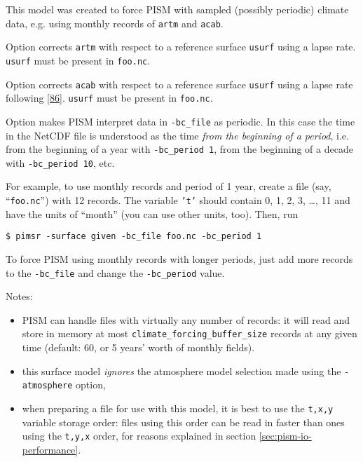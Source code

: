 \begin{itemize}
    This model was created to force PISM with sampled (possibly periodic) climate data, e.g. using monthly records of \texttt{artm} and \texttt{acab}.

 Option  corrects \texttt{artm} with respect to a reference surface \texttt{usurf} using a lapse rate. \texttt{usurf} must be present in \texttt{foo.nc}.

 Option  corrects \texttt{acab} with respect to a reference surface \texttt{usurf} using a lapse rate following [\href{http://www.truenuff.tv/glacierrace.php}{86}]. \texttt{usurf} must be present in \texttt{foo.nc}.

Option  makes PISM interpret data in \texttt{-bc_file} as periodic. In this case the time in the NetCDF file is understood as the time \emph{from the beginning of a period}, i.e. from the beginning of a year with \texttt{-bc_period 1}, from the beginning of a decade with \texttt{-bc_period 10}, etc.

For example, to use monthly records and period of 1 year, create a file (say, ``\texttt{foo.nc}'') with 12 records. The variable \texttt{'t'} should contain 0, 1, 2, 3, \dots, 11 and have the units of ``month'' (you can use other units, too). Then, run
\begin{verbatim}
$ pimsr -surface given -bc_file foo.nc -bc_period 1
\end{verbatim}%

To force PISM using monthly records with longer periods, just add more records to the \texttt{-bc_file}  and change the \texttt{-bc_period} value.

\noindent Notes:
\begin{itemize}
\item PISM can handle files with virtually any number of records: it will
  read and store in memory at most \texttt{climate_forcing_buffer_size} records
  at any given time (default: 60, or 5 years' worth of monthly fields).
\item this surface model \emph{ignores} the atmosphere model selection made
  using the \texttt{-atmosphere} option,
\item when preparing a file for use with this model, it is best to use the \texttt{t,x,y} variable storage order: files using this order can be read in faster than ones using the \texttt{t,y,x} order, for reasons explained in section \ref{sec:pism-io-performance}.


\end{itemize}
\end{itemize}
